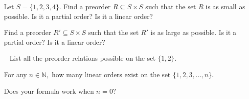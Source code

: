 \documentclass[../main/CT4S-EN-RU]{subfiles}
\begin{document}
\begin{exampleRUS}\label{ex:finite lo}
\end{exampleRUS}

\begin{exerciseENG}
Let $S=\{1,2,3,4\}.$ 
\sexc Find a preorder $R\subseteq S\times S$ such that the set $R$ is as small as possible. Is it a partial order? Is it a linear order?
\item Find a preorder $R'\subseteq S\times S$ such that the set $R'$ is as large as possible. Is it a partial order? Is it a linear order?
\endsexc
\end{exerciseENG}

\begin{exerciseRUS}
\end{exerciseRUS}

\begin{exerciseENG}~
\sexc List all the preorder relations possible on the set $\{1,2\}.$
\item For any $n\in{ℕ},$ how many linear orders exist on the set $\{1,2,3,\ldots,n\}.$ 
\item Does your formula work when $n=0?$
\endsexc
\end{exerciseENG}

\begin{exerciseRUS}~
\end{exerciseRUS}
\end{document}
